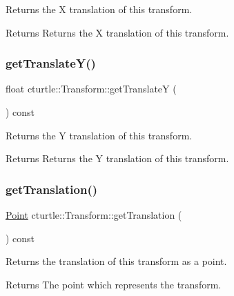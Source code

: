 Returns the X translation of this transform. 

\begin{DoxyReturn}{Returns}
Returns the X translation of this transform. 
\end{DoxyReturn}
\mbox{\label{classcturtle_1_1Transform_a9da2a0e256fdddbc0b5202c8d53a74bf}} 
\subsubsection{\texorpdfstring{get\+Translate\+Y()}{getTranslateY()}}
{\footnotesize\ttfamily float cturtle\+::\+Transform\+::get\+TranslateY (\begin{DoxyParamCaption}{ }\end{DoxyParamCaption}) const\hspace{0.3cm}{\ttfamily [inline]}}



Returns the Y translation of this transform. 

\begin{DoxyReturn}{Returns}
Returns the Y translation of this transform. 
\end{DoxyReturn}
\mbox{\label{classcturtle_1_1Transform_a1458bf240e11c44e32c9acc483406aec}} 
\subsubsection{\texorpdfstring{get\+Translation()}{getTranslation()}}
{\footnotesize\ttfamily \hyperlink{structcturtle_1_1ivec2}{Point} cturtle\+::\+Transform\+::get\+Translation (\begin{DoxyParamCaption}{ }\end{DoxyParamCaption}) const\hspace{0.3cm}{\ttfamily [inline]}}



Returns the translation of this transform as a point. 

\begin{DoxyReturn}{Returns}
The point which represents the transform. 
\end{DoxyReturn}
\mbox{\label{classcturtle_1_1Transform_a0102d86a459937597b4755650b94b4a2}} 
